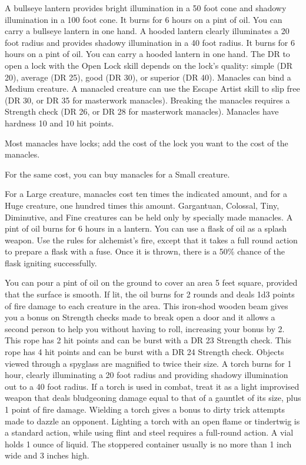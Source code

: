  A bullseye lantern provides bright illumination in a 50 foot cone and shadowy illumination in a 100 foot cone. It burns for 6 hours on a pint of oil. You can carry a bullseye lantern in one hand.
 A hooded lantern clearly illuminates a 20 foot radius and provides shadowy illumination in a 40 foot radius. It burns for 6 hours on a pint of oil. You can carry a hooded lantern in one hand.
 The DR to open a lock with the Open Lock skill depends on the lock's quality: simple (DR 20), average (DR 25), good (DR 30), or superior (DR 40).
 Manacles can bind a Medium creature. A manacled creature can use the Escape Artist skill to slip free (DR 30, or DR 35 for masterwork manacles). Breaking the manacles requires a Strength check (DR 26, or DR 28 for masterwork manacles). Manacles have hardness 10 and 10 hit points.
\par Most manacles have locks; add the cost of the lock you want to the cost of the manacles.
\par For the same cost, you can buy manacles for a Small creature.
\par For a Large creature, manacles cost ten times the indicated amount, and for a Huge creature, one hundred times this amount. Gargantuan, Colossal, Tiny, Diminutive, and Fine creatures can be held only by specially made manacles.
 A pint of oil burns for 6 hours in a lantern. You can use a flask of oil as a splash weapon. Use the rules for alchemist's fire, except that it takes a full round action to prepare a flask with a fuse. Once it is thrown, there is a 50\% chance of the flask igniting successfully.
\par You can pour a pint of oil on the ground to cover an area 5 feet square, provided that the surface is smooth. If lit, the oil burns for 2 rounds and deals 1d3 points of fire damage to each creature in the area.
 This iron-shod wooden beam gives you a  bonus on Strength checks made to break open a door and it allows a second person to help you without having to roll, increasing your bonus by 2.
 This rope has 2 hit points and can be burst with a DR 23 Strength check.
 This rope has 4 hit points and can be burst with a DR 24 Strength check.
 Objects viewed through a spyglass are magnified to twice their size.
 A torch burns for 1 hour, clearly illuminating a 20 foot radius and providing shadowy illumination out to a 40 foot radius. If a torch is used in combat, treat it as a light improvised weapon that deals bludgeoning damage equal to that of a gauntlet of its size, plus 1 point of fire damage. Wielding a torch gives a  bonus to dirty trick attempts made to dazzle an opponent. Lighting a torch with an open flame or tindertwig is a standard action, while using flint and steel requires a full-round action.
 A vial holds 1 ounce of liquid. The stoppered container usually is no more than 1 inch wide and 3 inches high.

